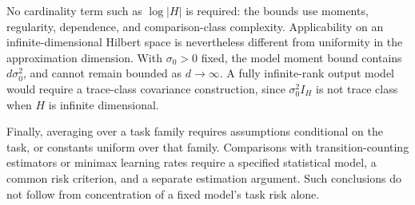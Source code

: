 No cardinality term such as \(\log|H|\) is required: the bounds use moments, regularity, dependence, and comparison-class complexity. Applicability on an infinite-dimensional Hilbert space is nevertheless different from uniformity in the approximation dimension. With \(\sigma_0>0\) fixed, the model moment bound contains \(d\sigma_0^2\), and cannot remain bounded as \(d\to\infty\). A fully infinite-rank output model would require a trace-class covariance construction, since \(\sigma_0^2I_H\) is not trace class when \(H\) is infinite dimensional.

Finally, averaging over a task family requires assumptions conditional on the task, or constants uniform over that family. Comparisons with transition-counting estimators or minimax learning rates require a specified statistical model, a common risk criterion, and a separate estimation argument. Such conclusions do not follow from concentration of a fixed model's task risk alone.
